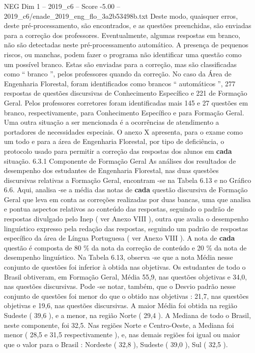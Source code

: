 \begin{textsample}{NEG Dim 1 – 2019\_c6 – Score -5.00 – 2019\_c6/enade\_2019\_eng\_flo\_3a2b53498b.txt}
Deste modo, quaisquer erros, deste pré-processamento, são encontrados, e as questões preenchidas, são enviadas para a correção dos professores.
Eventualmente, algumas respostas em branco, não são detectadas neste pré-processamento automático.
A presença de pequenos riscos, ou manchas, podem fazer o programa não identificar uma questão como um possível branco.
Estas são enviadas para a correção, mas são classificadas como “ branco ”, pelos professores quando da correção.
No caso da Área de Engenharia Florestal, foram identificados como brancos “ automáticos ”, 277 respostas de questões discursivas de Conhecimento Específico e 221 de Formação Geral.
Pelos professores corretores foram identificadas mais 145 e 27 questões em branco, respectivamente, para Conhecimento Específico e para Formação Geral.
Uma outra situação a ser mencionada é a ocorrências de atendimento a portadores de necessidades especiais.
O anexo X apresenta, para o exame como um todo e para a área de Engenharia Florestal, por tipo de deficiência, o protocolo usado para permitir a correção das respostas dos alunos em \textbf{cada} situação. 6.3.1 Componente de Formação Geral As análises dos resultados de desempenho dos estudantes de Engenharia Florestal, nas duas questões discursivas relativas a Formação Geral, encontram -se na Tabela 6.13 e no Gráfico 6.6.
Aqui, analisa -se a média das notas de \textbf{cada} questão discursiva de Formação Geral que leva em conta as correções realizadas por duas bancas, uma que analisa e pontua aspectos relativos ao conteúdo das respostas, seguindo o padrão de respostas divulgado pelo Inep ( ver Anexo VIII ), outra que avalia o desempenho linguístico expresso pela redação das respostas, seguindo um padrão de respostas específico da área de Língua Portuguesa ( ver Anexo VIII ).
A nota de \textbf{cada} questão é composta de 80 \% da nota da correção de conteúdo e 20 \% da nota de desempenho linguístico.
Na Tabela 6.13, observa -se que a nota Média nesse conjunto de questões foi inferior à obtida nas objetivas.
Os estudantes de todo o Brasil obtiveram, em Formação Geral, Média 55,9, nas questões objetivas e 34,0, nas questões discursivas.
Pode -se notar, também, que o Desvio padrão nesse conjunto de questões foi menor do que o obtido nas objetivas : 21,7, nas questões objetivas e 19,6, nas questões discursivas.
A maior Média foi obtida na região Sudeste ( 39,6 ), e a menor, na região Norte ( 29,4 ).
A Mediana de todo o Brasil, neste componente, foi 32,5.
Nas regiões Norte e Centro-Oeste, a Mediana foi menor ( 28,5 e 31,5 respectivamente ), e, nas demais regiões foi igual ou maior que o valor para o Brasil : Nordeste ( 32,8 ), Sudeste ( 39,0 ), Sul ( 32,5 ).

\end{textsample}
